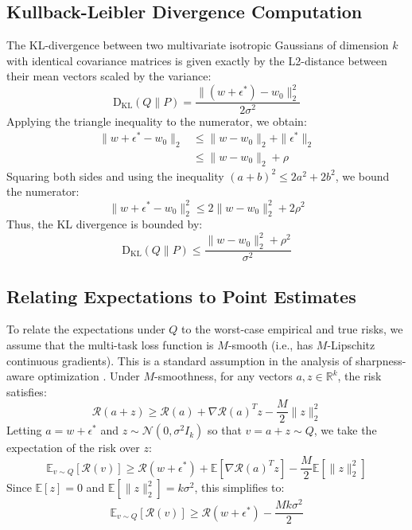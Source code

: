 \documentclass{article}
\begin{document}
\subsection{Kullback-Leibler Divergence Computation}
The KL-divergence between two multivariate isotropic Gaussians of dimension $k$ with identical covariance matrices is given exactly by the L2-distance between their mean vectors scaled by the variance:
\begin{equation}
    \text{D}_{\text{KL}}(Q \parallel P) = \frac{\| (w + \epsilon^*) - w_0 \|_2^2}{2\sigma^2}
\end{equation}
Applying the triangle inequality to the numerator, we obtain:
\begin{align}
    \| w + \epsilon^* - w_0 \|_2 &\le \| w - w_0 \|_2 + \| \epsilon^* \|_2 \nonumber \\
    &\le \| w - w_0 \|_2 + \rho
\end{align}
Squaring both sides and using the inequality $(a+b)^2 \le 2a^2 + 2b^2$, we bound the numerator:
\begin{equation}
    \| w + \epsilon^* - w_0 \|_2^2 \le 2 \| w - w_0 \|_2^2 + 2\rho^2
\end{equation}
Thus, the KL divergence is bounded by:
\begin{equation}
    \text{D}_{\text{KL}}(Q \parallel P) \le \frac{\| w - w_0 \|_2^2 + \rho^2}{\sigma^2}
\label{eq:kl_bound}
\end{equation}

\subsection{Relating Expectations to Point Estimates}
To relate the expectations under $Q$ to the worst-case empirical and true risks, we assume that the multi-task loss function is $M$-smooth (i.e., has $M$-Lipschitz continuous gradients). This is a standard assumption in the analysis of sharpness-aware optimization \cite{foret2021sharpness}. Under $M$-smoothness, for any vectors $a, z \in \mathbb{R}^k$, the risk satisfies:
\begin{equation}
    \mathcal{R}(a + z) \ge \mathcal{R}(a) + \nabla \mathcal{R}(a)^T z - \frac{M}{2} \| z \|_2^2
\end{equation}
Letting $a = w + \epsilon^*$ and $z \sim \mathcal{N}(0, \sigma^2 I_k)$ so that $v = a + z \sim Q$, we take the expectation of the risk over $z$:
\begin{equation}
    \mathbb{E}_{v \sim Q}[\mathcal{R}(v)] \ge \mathcal{R}(w + \epsilon^*) + \mathbb{E}[ \nabla \mathcal{R}(a)^T z ] - \frac{M}{2} \mathbb{E}[ \| z \|_2^2 ]
\end{equation}
Since $\mathbb{E}[z] = 0$ and $\mathbb{E}[ \|z\|_2^2 ] = k\sigma^2$, this simplifies to:
\begin{equation}
    \mathbb{E}_{v \sim Q}[\mathcal{R}(v)] \ge \mathcal{R}(w + \epsilon^*) - \frac{M k \sigma^2}{2}
\label{eq:true_risk_lower}
\end{equation}
\end{document}
